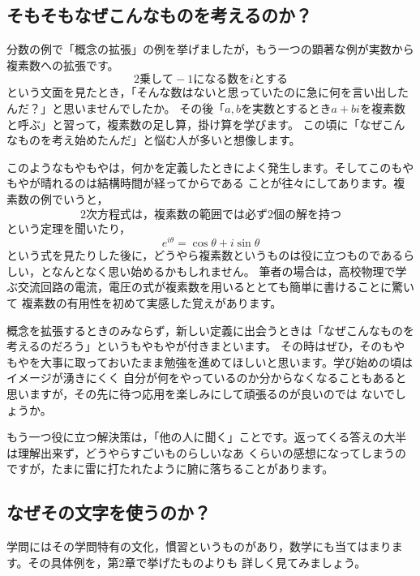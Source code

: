 \documentclass[./main]{subfiles}
\begin{document}
\subsection{そもそもなぜこんなものを考えるのか？}

分数の例で「概念の拡張」の例を挙げましたが，もう一つの顕著な例が実数から複素数への拡張です。
\[ 2乗して-1になる数をiとする\]
という文面を見たとき，「そんな数はないと思っていたのに急に何を言い出したんだ？」と思いませんでしたか。
その後「$a,b$を実数とするとき$a+bi$を複素数と呼ぶ」と習って，複素数の足し算，掛け算を学びます。
この頃に「なぜこんなものを考え始めたんだ」と悩む人が多いと想像します。

このようなもやもやは，何かを定義したときによく発生します。そしてこのもやもやが晴れるのは結構時間が経ってからである
ことが往々にしてあります。複素数の例でいうと，
\[
2次方程式は，複素数の範囲では必ず2個の解を持つ
\]
という定理を聞いたり，
\[
e^{i \theta} = \cos \theta + i \sin \theta
\]
という式を見たりした後に，どうやら複素数というものは役に立つものであるらしい，となんとなく思い始めるかもしれません。
筆者の場合は，高校物理で学ぶ交流回路の電流，電圧の式が複素数を用いるととても簡単に書けることに驚いて
複素数の有用性を初めて実感した覚えがあります。

概念を拡張するときのみならず，新しい定義に出会うときは「なぜこんなものを考えるのだろう」というもやもやが付きまといます。
その時はぜひ，そのもやもやを大事に取っておいたまま勉強を進めてほしいと思います。学び始めの頃はイメージが湧きにくく
自分が何をやっているのか分からなくなることもあると思いますが，その先に待つ応用を楽しみにして頑張るのが良いのでは
ないでしょうか。

もう一つ役に立つ解決策は，「他の人に聞く」ことです。返ってくる答えの大半は理解出来ず，どうやらすごいものらしいなあ
くらいの感想になってしまうのですが，たまに雷に打たれたように腑に落ちることがあります。

\subsection{なぜその文字を使うのか？}

学問にはその学問特有の文化，慣習というものがあり，数学にも当てはまります。その具体例を，第2章で挙げたものよりも
詳しく見てみましょう。
\end{document}
